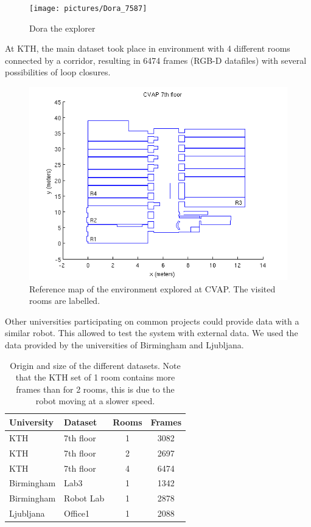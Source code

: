 \begin{figure}[h]
 \begin{center}
 \texttt{[image: pictures/Dora\_7587]}
 \end{center}
\caption{Dora the explorer}
\end{figure}

At KTH, the main dataset took place in environment with 4 different rooms connected by a corridor, resulting in 6474 frames (RGB-D datafiles) with several possibilities of loop closures. 

\begin{figure}[H]
\centering
\includegraphics[width=1\textwidth]{figures/cvap_7th}
\caption{Reference map of the environment explored at CVAP. The visited rooms are labelled.}
\end{figure}

Other universities participating on common projects could provide data with a similar robot. This allowed to test the system with external data. We used the data provided by the universities of Birmingham and Ljubljana.

\begin{table}[H]
 \begin{center}
  \begin{tabular}{llcc}
  \hline
  University & Dataset & Rooms & Frames \\
  \hline
  KTH & 7th floor & 1 & 3082 \\
  KTH & 7th floor & 2 & 2697 \\
  KTH & 7th floor & 4 & 6474 \\
  Birmingham & Lab3 & 1 & 1342 \\
  Birmingham & Robot Lab & 1 & 2878 \\
  Ljubljana & Office1 & 1 & 2088 \\
  \hline
  \end{tabular}
 \end{center}
 \caption{Origin and size of the different datasets. Note that the KTH set of 1 room contains more frames than for 2 rooms, this is due to the robot moving at a slower speed.}
\end{table}

